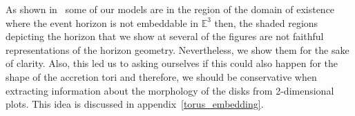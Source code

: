 \documentclass[twocolumn,aps,showpacs,showkeys,prd,superscriptaddress,byrevtex, amsmath]{revtex4-1}
\begin{document}

As shown in~\cite{Delgado:2018} some  of our models are in the region of the domain of existence where the event horizon is not embeddable in $\mathbb{E}^3$ then, the shaded regions depicting the horizon that we show at several of the figures are not faithful representations of the horizon geometry. Nevertheless, we show them for the sake of clarity. Also, this led us to asking ourselves if this could also happen for the shape of the accretion tori and therefore, we should be conservative when extracting information about the morphology of the disks from 2-dimensional plots. This idea is discussed in appendix~\ref{torus_embedding}.

%
\end{document}
